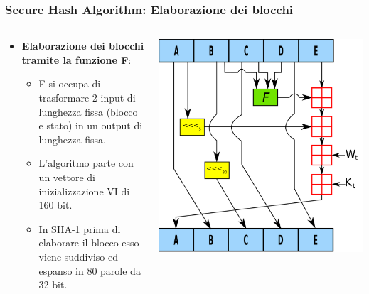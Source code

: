 \begin{frame}
	\frametitle{Secure Hash Algorithm: Elaborazione dei blocchi}

	\begin{columns}
		\begin{column}{0.6\textwidth}
			\begin{itemize}
				\item \textbf{Elaborazione dei blocchi tramite la funzione F}:
				      \begin{itemize}
					      \item F si occupa di trasformare 2 input di lunghezza fissa (blocco e stato) in un output di lunghezza fissa.
					      \item L'algoritmo parte con un vettore di inizializzazione VI di 160 bit.
					      \item In SHA-1 prima di elaborare il blocco esso viene suddiviso ed espanso in 80 parole da 32 bit.
				      \end{itemize}
			\end{itemize}
		\end{column}

		\begin{column}{0.4\textwidth}
			\includegraphics[width=\textwidth]{img/1-img/SHA-1.png}
		\end{column}
	\end{columns}

\end{frame}